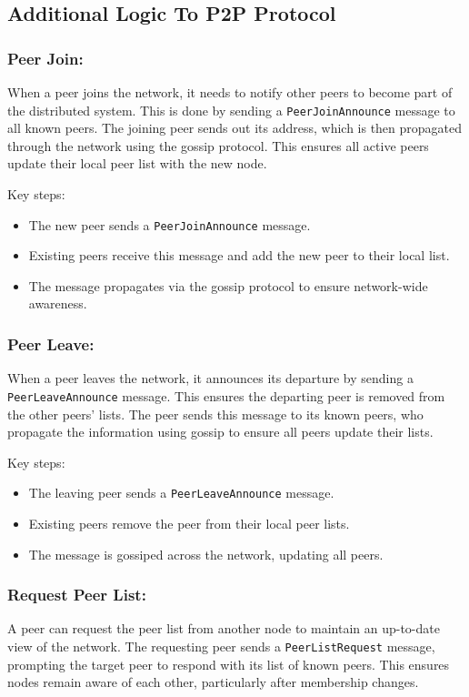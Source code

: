   
\subsection{Additional Logic To P2P Protocol}

\subsubsection{Peer Join:}
When a peer joins the network, it needs to notify other peers to become part of the distributed system. This is done by sending a \texttt{PeerJoinAnnounce} message to all known peers. The joining peer sends out its address, which is then propagated through the network using the gossip protocol. This ensures all active peers update their local peer list with the new node.

Key steps:
\begin{itemize}
    \item The new peer sends a \texttt{PeerJoinAnnounce} message.
    \item Existing peers receive this message and add the new peer to their local list.
    \item The message propagates via the gossip protocol to ensure network-wide awareness.
\end{itemize}

\subsubsection{Peer Leave:}
When a peer leaves the network, it announces its departure by sending a \texttt{PeerLeaveAnnounce} message. This ensures the departing peer is removed from the other peers' lists. The peer sends this message to its known peers, who propagate the information using gossip to ensure all peers update their lists.

Key steps:
\begin{itemize}
    \item The leaving peer sends a \texttt{PeerLeaveAnnounce} message.
    \item Existing peers remove the peer from their local peer lists.
    \item The message is gossiped across the network, updating all peers.
\end{itemize}

\subsubsection{Request Peer List:}
A peer can request the peer list from another node to maintain an up-to-date view of the network. The requesting peer sends a \texttt{PeerListRequest} message, prompting the target peer to respond with its list of known peers. This ensures nodes remain aware of each other, particularly after membership changes.

